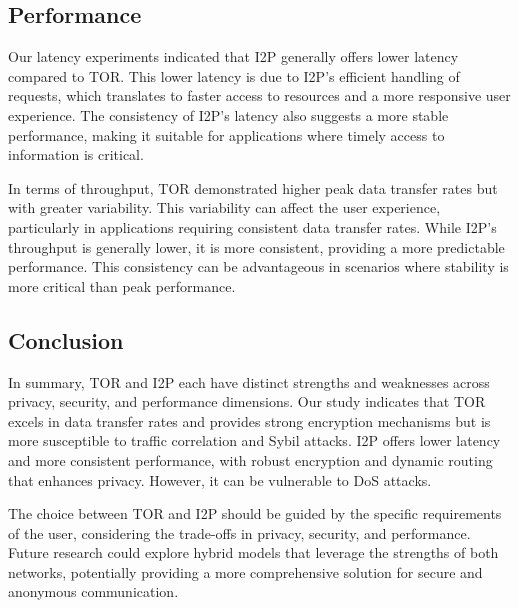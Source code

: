 \documentclass[12pt,conference]{IEEEtran}
\begin{document}
\subsection{Performance}
Our latency experiments indicated that I2P generally offers lower latency compared to TOR. This lower latency is due to I2P’s efficient handling of requests, which translates to faster access to resources and a more responsive user experience. The consistency of I2P’s latency also suggests a more stable performance, making it suitable for applications where timely access to information is critical.

In terms of throughput, TOR demonstrated higher peak data transfer rates but with greater variability. This variability can affect the user experience, particularly in applications requiring consistent data transfer rates. While I2P’s throughput is generally lower, it is more consistent, providing a more predictable performance. This consistency can be advantageous in scenarios where stability is more critical than peak performance.

\subsection{Conclusion}
In summary, TOR and I2P each have distinct strengths and weaknesses across privacy, security, and performance dimensions. Our study indicates that TOR excels in data transfer rates and provides strong encryption mechanisms but is more susceptible to traffic correlation and Sybil attacks. I2P offers lower latency and more consistent performance, with robust encryption and dynamic routing that enhances privacy. However, it can be vulnerable to DoS attacks.

The choice between TOR and I2P should be guided by the specific requirements of the user, considering the trade-offs in privacy, security, and performance. Future research could explore hybrid models that leverage the strengths of both networks, potentially providing a more comprehensive solution for secure and anonymous communication.
\end{document}
